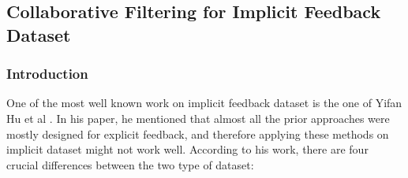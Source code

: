 \subsection{Collaborative Filtering for Implicit Feedback Dataset}

\subsubsection{Introduction}
One of the most well known work on implicit feedback dataset is the one of Yifan Hu et al \cite{hu2008collaborative}. In his paper, he mentioned that almost all the prior approaches were mostly designed for explicit feedback, and therefore applying these methods on implicit dataset might not work well. According to his work, there are four crucial differences between the two type of dataset:

